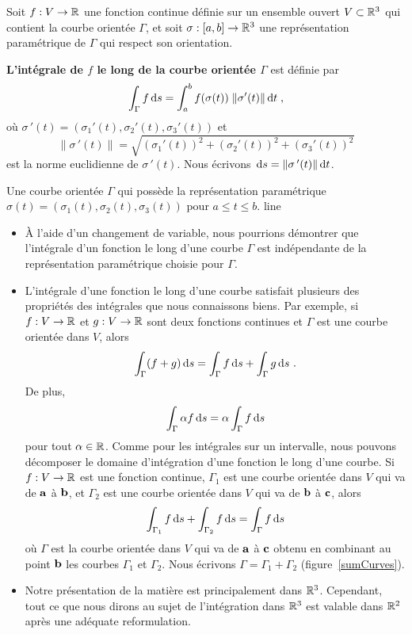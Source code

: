 {\begin{focus}{\dfn}
Soit $f:V \rightarrow \mathbb{R}$ une fonction continue définie 
sur un ensemble ouvert $V \subset \mathbb{R}^3$ qui contient la courbe
orientée $\Gamma$, et soit $\sigma:[a,b]\to \mathbb{R}^3$ une représentation
paramétrique de $\Gamma$ qui respect son orientation.

{\bfseries L'intégrale de $f$ le long de la courbe orientée $\Gamma$}
est définie par
\[
\int_\Gamma f \,\mathrm{d}s = \int_a^b f(\sigma(t)) \; \| \sigma'(t) \| \,\mathrm{d}t \;,
\]
où $\sigma\,'(t) = (\sigma_1'(t),\sigma_2'(t),\sigma_3'(t))$ et
\[
\| \sigma\,'(t) \| = \sqrt{(\sigma_1'(t))^2+(\sigma_2'(t))^2+(\sigma_3'(t))^2}
\]
est la norme euclidienne de $\sigma\,'(t)$.
Nous écrivons $\,\mathrm{d}s = \|\sigma\,'(t)\| \,\mathrm{d}t$.
\end{focus}

{Une courbe orientée $\Gamma$ qui possède la représentation paramétrique
$\sigma(t) = (\sigma_1(t), \sigma_2(t), \sigma_3(t))$ pour $a\leq t \leq b$.}
{line}

\begin{rmkList}
\begin{itemize}
\item À l'aide d'un changement de variable, nous pourrions démontrer que
l'intégrale d'un fonction le long d'une courbe $\Gamma$ est
indépendante de la représentation paramétrique choisie pour $\Gamma$.
\item L'intégrale d'une fonction le long d'une courbe satisfait
plusieurs des propriétés des intégrales que nous connaissons biens.
Par exemple, si $f:V\to \mathbb{R}$ et $g:V\to \mathbb{R}$ sont deux fonctions
continues et $\Gamma$ est une courbe orientée dans $V$, alors
\[
\int_\Gamma (f+g) \,\mathrm{d}s = \int_\Gamma f \,\mathrm{d}s + \int_\Gamma g \,\mathrm{d}s
\ .
\]
De plus,
\[
\int_\Gamma \alpha f \,\mathrm{d}s = \alpha \int_\Gamma f \,\mathrm{d}s
\]
pour tout $\alpha \in \mathbb{R}$.  Comme pour les intégrales sur un
intervalle, nous pouvons décomposer le domaine d'intégration d'une
fonction le long d'une courbe.   Si $f:V\to \mathbb{R}$ est une fonction
continue, $\Gamma_1$ est une courbe orientée dans $V$ qui va de
$\mathbf{a}$ à $\mathbf{b}$, et $\Gamma_2$ est une courbe orientée dans $V$
qui va de $\mathbf{b}$ à $\mathbf{c}$, alors
\[
  \int_{\Gamma_1} f \,\mathrm{d}s + \int_{\Gamma_2} f\,\mathrm{d}s
  = \int_\Gamma f \,\mathrm{d}s
\]
où $\Gamma$ est la courbe orientée dans $V$ qui va de $\mathbf{a}$ à
$\mathbf{c}$ obtenu en combinant au point $\mathbf{b}$ les courbes $\Gamma_1$ et
$\Gamma_2$.  Nous écrivons $\Gamma = \Gamma_1 + \Gamma_2$
(figure~\ref{sumCurves}).
\item Notre présentation de la matière est principalement dans
$\mathbb{R}^3$.  Cependant, tout ce que nous dirons au sujet de l'intégration
dans $\mathbb{R}^3$ est valable dans $\mathbb{R}^2$ après une adéquate
reformulation.
\end{itemize}
\end{rmkList}

}
